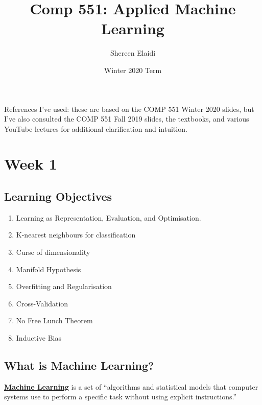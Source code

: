 \documentclass[11pt]{scrartcl}
\title{\textbf{Comp 551: Applied Machine Learning}}
\author{Shereen Elaidi}
\date{Winter 2020 Term}
\theoremstyle{definition}
\theoremstyle{remark}
\newcommand{\dfn}[1]{\textbf{\underline{#1}}}
\begin{document}
\maketitle
\tableofcontents

References I've used: these are based on the COMP 551 Winter 2020 slides, but I've also consulted the COMP 551 Fall 2019 slides, the textbooks, and various YouTube lectures for additional clarification and intuition. 


\section{Week 1}
\subsection{Learning Objectives}
\begin{enumerate}[noitemsep]
	\item Learning as Representation, Evaluation, and Optimisation. 
	\item K-nearest neighbours for classification
	\item Curse of dimensionality 
	\item Manifold Hypothesis 
	\item Overfitting and Regularisation
	\item Cross-Validation
	\item No Free Lunch Theorem
	\item Inductive Bias
\end{enumerate}

\subsection{What is Machine Learning?}

\begin{center}
\dfn{Machine Learning} is a set of ``algorithms and statistical models that computer systems use to perform a specific task without using explicit instructions.'' 
\end{center} 
\end{document}
